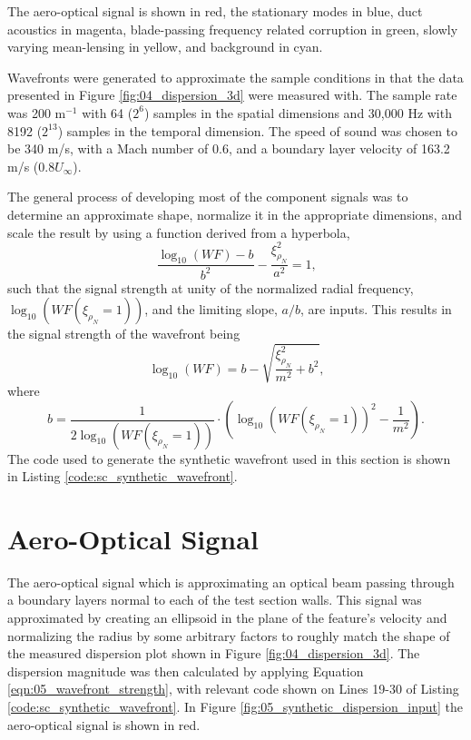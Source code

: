 The aero-optical signal is shown in red, the stationary modes in blue, duct acoustics in magenta, blade-passing frequency related corruption in green, slowly varying mean-lensing in yellow, and background in cyan.

Wavefronts were generated to approximate the sample conditions in that the data presented in Figure \ref{fig:04_dispersion_3d} were measured with.
The sample rate was 200 m$^{-1}$ with 64 ($2^6$) samples in the spatial dimensions and 30,000 Hz with 8192 ($2^{13}$) samples in the temporal dimension.
The speed of sound was chosen to be 340 m/s, with a Mach number of 0.6, and a boundary layer velocity of 163.2 m/s ($0.8U_\infty$).

The general process of developing most of the component signals was to determine an approximate shape, normalize it in the appropriate dimensions, and scale the result by using a function derived from a hyperbola,
\begin{equation}
 \frac{\log_{10}(WF)-b}{b^2}-\frac{\xi_{\rho_N}^2}{a^2} = 1 \textrm{,}
 \label{eqn:05_scaling_hyperbola}
\end{equation}
such that the signal strength at unity of the normalized radial frequency, $\log_{10}(WF(\xi_{\rho_N}=1))$, and the limiting slope, $a/b$, are inputs.
This results in the signal strength of the wavefront being
\begin{equation}
 \log_{10}(WF) = b-\sqrt{\frac{\xi_{\rho_N}^2}{m^2}+b^2} \textrm{,}
 \label{eqn:05_wavefront_strength}
\end{equation}
where
\begin{equation}
 b = \frac{1}{2\log_{10}(WF(\xi_{\rho_N}=1))}\cdot\left(\log_{10}(WF(\xi_{\rho_N}=1))^2-\frac{1}{m^2}\right) \textrm{.}
 \label{eqn:05_wavefront_strength_b}
\end{equation}
The code used to generate the synthetic wavefront used in this section is shown in Listing \ref{code:sc_synthetic_wavefront}.

\section{Aero-Optical Signal}
The aero-optical signal which is approximating an optical beam passing through a boundary layers normal to each of the test section walls.
This signal was approximated by creating an ellipsoid in the plane of the feature's velocity and normalizing the radius by some arbitrary factors to roughly match the shape of the measured dispersion plot shown in Figure \ref{fig:04_dispersion_3d}.
The dispersion magnitude was then calculated by applying Equation \ref{eqn:05_wavefront_strength}, with relevant code shown on Lines 19-30 of Listing \ref{code:sc_synthetic_wavefront}.
In Figure \ref{fig:05_synthetic_dispersion_input} the aero-optical signal is shown in red.

